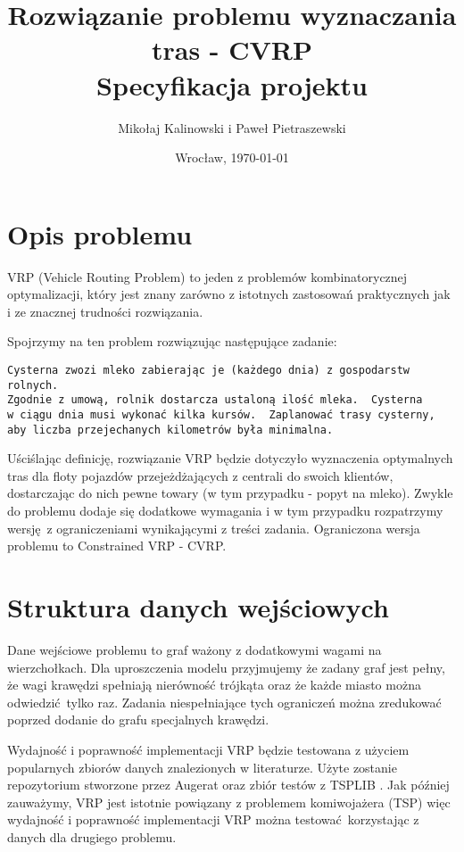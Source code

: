 \documentclass[fleqn,11pt]{article}
\title{{\Huge \textbf{Rozwiązanie problemu wyznaczania tras - CVRP} \\}
         {\Large Specyfikacja projektu}}
\date{Wrocław, \today}
\author{Mikołaj Kalinowski i Paweł Pietraszewski}
\begin{document}
\maketitle

\section{Opis problemu}
VRP (Vehicle Routing Problem) to jeden z problemów kombinatorycznej optymalizacji, który jest znany zarówno z istotnych zastosowań praktycznych jak i ze znacznej trudności rozwiązania.

Spojrzymy na ten problem rozwiązując następujące zadanie:

\begin{verbatim}
Cysterna zwozi mleko zabierając je (każdego dnia) z gospodarstw rolnych.  
Zgodnie z umową, rolnik dostarcza ustaloną ilość mleka.  Cysterna 
w ciągu dnia musi wykonać kilka kursów.  Zaplanować trasy cysterny, 
aby liczba przejechanych kilometrów była minimalna.
\end{verbatim}

Uściślając definicję, rozwiązanie VRP będzie dotyczyło wyznaczenia optymalnych tras dla floty pojazdów przejeżdżających z centrali do swoich klientów, dostarczając do nich pewne towary (w tym przypadku - popyt na mleko).  Zwykle do problemu dodaje się dodatkowe wymagania i w tym przypadku rozpatrzymy wersję z ograniczeniami wynikającymi z treści zadania.  Ograniczona wersja problemu to Constrained VRP - CVRP.

\section{Struktura danych wejściowych}

Dane wejściowe problemu to graf ważony z dodatkowymi wagami na wierzchołkach.
Dla uproszczenia modelu przyjmujemy że zadany graf jest pełny, że wagi krawędzi spełniają nierówność trójkąta oraz że każde miasto można odwiedzić tylko raz.  Zadania niespełniające tych ograniczeń można zredukować poprzed dodanie do grafu specjalnych krawędzi.

Wydajność i poprawność implementacji VRP będzie testowana z użyciem popularnych zbiorów danych znalezionych w literaturze.  Użyte zostanie repozytorium stworzone przez Augerat \cite{AUG} oraz zbiór testów z TSPLIB \cite{TSPLIB}.  Jak później zauważymy, VRP jest istotnie powiązany z problemem komiwojażera (TSP) więc wydajność i poprawność implementacji VRP można testować korzystając z danych dla drugiego problemu.
\end{document}
